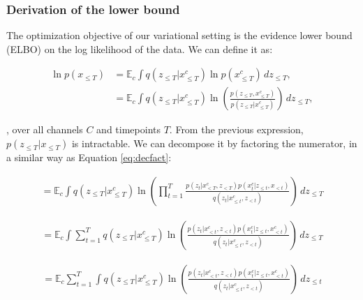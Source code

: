 \subsubsection{Derivation of the lower bound}
The optimization objective of our variational setting is the evidence lower bound (ELBO) \cite{Kingma2014} on the log likelihood of the data. We can define it as:

\begin{equation} 
\begin{aligned}
\displaystyle
    \ln \mathit{p}(x_{\leq T}) &= \mathbb{E}_c \int \mathit{q}(z_{\leq T}|x^c_{\leq T}) \ln \mathit{p}(x^c_{\leq T}) \,dz_{\leq T}, \\
&= \mathbb{E}_c \int \mathit{q}(z_{\leq T}|x^c_{\leq T}) \ln \left( \frac{\mathit{p}(z_{\leq T},x^c_{\leq T})}{\mathit{p}(z_{\leq T}|x^c_{\leq T})} \right) \,dz_{\leq T},
\end{aligned} \label{rnn:eq_loglike}
\end{equation}

, over all channels $C$ and timepoints $T$. From the previous expression, $\mathit{p}(z_{\leq T}|x_{\leq T})$ is intractable. We can decompose it by factoring the numerator, in a similar way as Equation \ref{eq:decfact}:

\begin{equation} 
\begin{aligned}
\displaystyle
= \mathbb{E}_c \int \mathit{q}(z_{\leq T}|x^c_{\leq T}) \ln \left( \prod^T_{t=1} \frac{\mathit{p}(z_t |x^c_{< T}, z_{< T})\mathit{p}(x^c_t |z_{\leq t}, x_{< t})}{\mathit{q}(z_t |x^c_{\leq t}, z_{< t})} \right) \,dz_{\leq T}
\end{aligned}
\end{equation}

\begin{equation} 
\begin{aligned}
\displaystyle
= \mathbb{E}_c \int \sum^T_{t=1} \mathit{q}(z_{\leq T}|x^c_{\leq T}) \ln \left( \frac{\mathit{p}(z_t |x^c_{< t}, z_{< t})\mathit{p}(x^c_t |z_{\leq t}, x^c_{< t})}{\mathit{q}(z_t |x^c_{\leq t}, z_{< t})} \right) \,dz_{\leq T}
\end{aligned}
\end{equation}

\begin{equation} 
\begin{aligned}
\displaystyle
= \mathbb{E}_c \sum^T_{t=1} \int \mathit{q}(z_{\leq T}|x^c_{\leq T}) \ln \left( \frac{\mathit{p}(z_t |x^c_{< t}, z_{< t})\mathit{p}(x^c_t |z_{\leq t}, x^c_{< t})}{\mathit{q}(z_t |x^c_{\leq t}, z_{< t})} \right)\, dz_{\leq t}
\end{aligned}
\end{equation}

